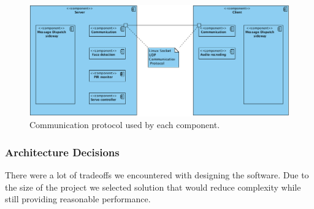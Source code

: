 \documentclass[11pt,a4paper,titlepage]{report}
\begin{document}
\begin{figure}
\centering
\includegraphics[width=\textwidth]{graphs/udp.png}
\caption{Communication protocol used by each component.}
\label{fig:udp}
\end{figure}



\subsubsection{Architecture Decisions}

There were a lot of tradeoffs we encountered with designing the software. Due to the size of the project we selected solution that would reduce complexity while still providing reasonable performance.
\end{document}

